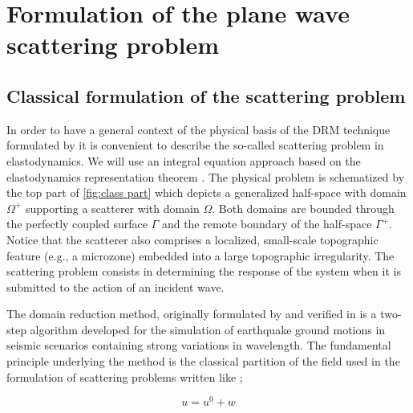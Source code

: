\documentclass[12pt,letterpaper]{article}
\begin{document}
\section{Formulation of the plane wave scattering problem}
\subsection*{Classical formulation of the scattering problem}

In order to have a general context of the physical basis of the DRM technique formulated by \cite{bielak2003} it is convenient to describe the so-called scattering problem in elastodynamics. We will use an integral equation approach based on the elastodynamics representation theorem \citep{vara1976}. The physical problem is schematized by the top part of \cref{fig:class part} which depicts a generalized half-space with domain $\Omega^+$ supporting a scatterer with domain $\Omega$. Both domains are bounded through the perfectly coupled surface $\Gamma$ and the remote boundary of the half-space $\Gamma^+$. Notice that the scatterer also comprises a localized, small-scale topographic feature (e.g., a microzone) embedded into a large topographic irregularity. The scattering problem consists in determining the response of the system when it is submitted to the action of an incident wave.

The domain reduction method, originally formulated by \cite{bielak2003} and verified in \cite{yoshimura2003domain} is a two-step algorithm developed for the simulation of earthquake ground motions in seismic scenarios containing strong variations in wavelength. The fundamental principle underlying the method is the classical partition of the field used in the formulation of scattering problems \citep{vara1976, courant2008methods, Bielak1984} written like ;

\begin{equation}
\label{free field}
{u}={u^0}+{w}
\end{equation}
\end{document}
